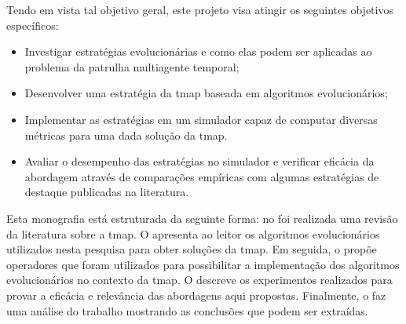 Tendo em vista tal objetivo geral, este projeto visa atingir os seguintes 
objetivos específicos:

\begin{itemize}
	\item Investigar estratégias evolucionárias e como elas podem ser aplicadas 
		ao problema da patrulha multiagente temporal;
	\item Desenvolver uma estratégia da \ac{tmap} baseada em algoritmos  
		evolucionários;
	\item Implementar as estratégias em um simulador capaz de computar diversas 
		métricas para uma dada solução da \ac{tmap}.
	\item Avaliar o desempenho das estratégias no simulador e verificar eficácia
		da abordagem através de comparações empíricas com algumas estratégias de 
		destaque publicadas na literatura.
\end{itemize}

Esta monografia está estruturada da seguinte forma: no  
foi realizada uma revisão da literatura sobre a \ac{tmap}. O  
apresenta ao leitor os algoritmos evolucionários utilizados nesta pesquisa para 
obter soluções da \ac{tmap}. Em seguida, o  propõe  
operadores que foram utilizados para possibilitar a implementação dos algoritmos 
evolucionários no contexto da \ac{tmap}. O  descreve os 
experimentos realizados para provar a eficácia e relevância das abordagens aqui 
propostas. Finalmente, o  faz uma análise do trabalho 
mostrando as conclusões que podem ser extraídas.